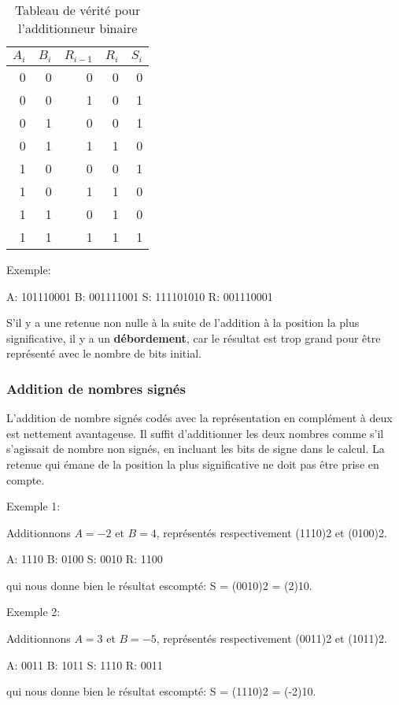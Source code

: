 \documentclass[11pt]{article}
\begin{document}
\begin{table}[htbp]
\caption{\label{tab:orgdd13621}Tableau de vérité pour l'additionneur binaire}
\centering
\begin{tabular}{rrrrr}
\(A_{i}\) & \(B_{i}\) & \(R_{i-1}\) & \(R_{i}\) & \(S_{i}\)\\
\hline
0 & 0 & 0 & 0 & 0\\
0 & 0 & 1 & 0 & 1\\
0 & 1 & 0 & 0 & 1\\
0 & 1 & 1 & 1 & 0\\
1 & 0 & 0 & 0 & 1\\
1 & 0 & 1 & 1 & 0\\
1 & 1 & 0 & 1 & 0\\
1 & 1 & 1 & 1 & 1\\
\end{tabular}
\end{table}


Exemple:

A: 101110001
B: 001111001
S: 111101010
R: 001110001

S'il y a une retenue non nulle à la suite de l'addition à la position
la plus significative, il y a un \textbf{débordement}, car le résultat est trop
grand pour être représenté avec le nombre de bits initial.

\subsubsection{Addition de nombres signés}
\label{sec:org5222044}

L'addition de nombre signés codés avec la représentation en complément
à deux est nettement avantageuse. Il suffit d’additionner les deux
nombres comme s'il s'agissait de nombre non signés, en incluant les
bits de signe dans le calcul. La retenue qui émane de la position la
plus significative ne doit pas être prise en compte. 

Exemple 1:

Additionnons \(A=-2\) et \(B=4\), représentés respectivement (1110)2 et (0100)2.

A: 1110
B: 0100
S: 0010
R: 1100

qui nous donne bien le résultat escompté: S = (0010)2 = (2)10.

Exemple 2:

Additionnons \(A=3\) et \(B=-5\), représentés respectivement (0011)2 et (1011)2.

A: 0011
B: 1011
S: 1110
R: 0011

qui nous donne bien le résultat escompté: S = (1110)2 = (-2)10.
\end{document}
